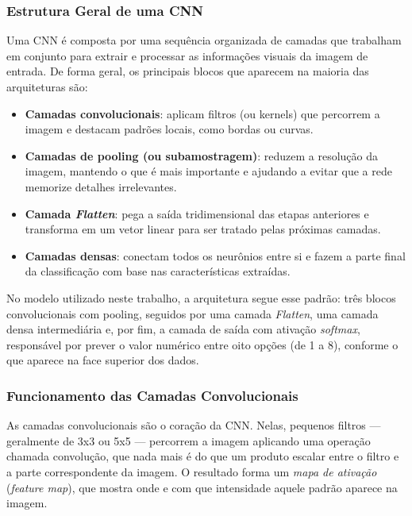 \subsubsection{Estrutura Geral de uma CNN}

Uma CNN é composta por uma sequência organizada de camadas que trabalham em conjunto para extrair e processar as informações visuais da 
imagem de entrada. De forma geral, os principais blocos que aparecem na maioria das arquiteturas são:

\begin{itemize}
    \item \textbf{Camadas convolucionais}: aplicam filtros (ou kernels) que percorrem a imagem e destacam padrões locais, como bordas ou curvas.
    \item \textbf{Camadas de pooling (ou subamostragem)}: reduzem a resolução da imagem, mantendo o que é mais importante e ajudando a
     evitar que a rede memorize detalhes irrelevantes.
    \item \textbf{Camada \textit{Flatten}}: pega a saída tridimensional das etapas anteriores e transforma em um vetor linear para ser 
    tratado pelas próximas camadas.
    \item \textbf{Camadas densas}: conectam todos os neurônios entre si e fazem a parte final da classificação com base nas características 
    extraídas.
\end{itemize}

No modelo utilizado neste trabalho, a arquitetura segue esse padrão: três blocos convolucionais com pooling, seguidos por uma camada 
\textit{Flatten}, uma camada densa intermediária e, por fim, a camada de saída com ativação \textit{softmax}, responsável por prever o 
valor numérico entre oito opções (de 1 a 8), conforme o que aparece na face superior dos dados.

\subsubsection{Funcionamento das Camadas Convolucionais}

As camadas convolucionais são o coração da CNN. Nelas, pequenos filtros — geralmente de 3x3 ou 5x5 — percorrem a imagem aplicando uma 
operação chamada convolução, que nada mais é do que um produto escalar entre o filtro e a parte correspondente da imagem. O resultado 
forma um \textit{mapa de ativação} (\textit{feature map}), que mostra onde e com que intensidade aquele padrão aparece na imagem.

